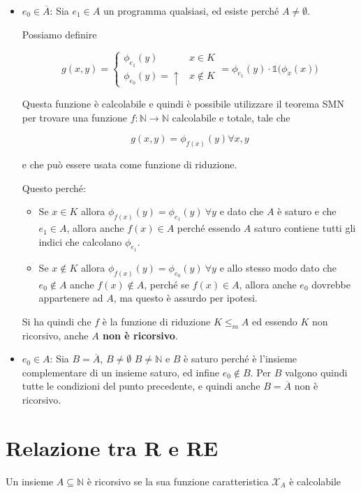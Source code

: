 \begin{itemize}
	\item $e_0 \in \overline{A}$: Sia $e_1 \in A$ un programma qualsiasi, ed esiste perché $A \neq \emptyset$.
	
	Possiamo definire
	
	$$
	g(x,y) = \begin{cases}
	\phi_{e_1}(y) &x \in K \\
	\phi_{e_0}(y) = \uparrow & x \notin K
	\end{cases} = \phi_{e_1}(y) \cdot \mathbb{1} \big( \phi_x(x) \big)
	$$ 
	
	Questa funzione è calcolabile e quindi è possibile utilizzare il teorema SMN per trovare una funzione $f : \mathbb{N} \rightarrow \mathbb{N}$ calcolabile e totale, tale che 
	
	$$
	g(x,y) = \phi_{f(x)}(y) \forall x,y
	$$
	
	e che può essere usata come funzione di riduzione.
	
	Questo perché:
	\begin{itemize}
		\item Se $x	\in K$ allora $\phi_{f(x)}(y) = \phi_{e_1}(y) \: \forall y$ e dato che $A$ è saturo e che $e_1 \in A$, allora anche $f(x) \in A$ perché essendo $A$ saturo contiene tutti gli indici che calcolano $\phi_{e_1} $.
		\item Se $x \notin K$ allora $\phi_{f(x)}(y) = \phi_{e_0}(y) \: \forall y$ e allo stesso modo dato che $e_0 \notin A$ anche $f(x) \notin A$, perché se $f(x) \in A$, allora anche $e_0$ dovrebbe appartenere ad $A$, ma questo è assurdo per ipotesi.
	\end{itemize}
	
	Si ha quindi che $f$ è la funzione di riduzione $K \leq_m A$ ed essendo $K$ non ricorsivo, anche \textbf{$A$ non è ricorsivo}.
	
	\item $e_0 \in A$: Sia $B = \overline{A}$, $B \neq \emptyset$ $B \neq \mathbb{N}$ e $B$ è saturo perché è l'insieme complementare di un insieme saturo, ed infine $e_0 \notin B$. Per $B$ valgono quindi tutte le condizioni del punto precedente, e quindi anche $B = \overline{A}$ non è ricorsivo.
\end{itemize} 


\section{Relazione tra R e RE}

Un insieme $A \subseteq \mathbb{N}$ è ricorsivo se la sua funzione caratteristica $\mathcal{X}_A$ è calcolabile

